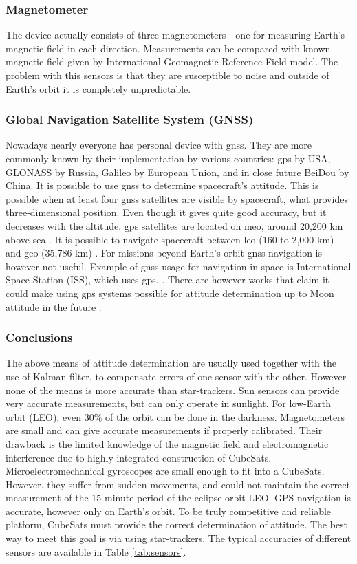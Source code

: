 \documentclass[12pt,a4paper,twoside]{article}
\begin{document}
\subsubsection{Magnetometer}
The device actually consists of three magnetometers - one for measuring Earth's magnetic field in each direction. Measurements can be compared with known magnetic field given by International Geomagnetic Reference Field model. The problem with this sensors is that they are susceptible to noise and outside of Earth's orbit it is completely unpredictable.
\subsubsection{Global Navigation Satellite System (GNSS)}
Nowadays nearly everyone has personal device with \gls{gnss}. They are more commonly known by their implementation by various countries: \gls{gps} by USA, GLONASS by Russia, Galileo by European Union, and in close future BeiDou by China. It is possible to use \gls{gnss} to determine spacecraft's attitude. This is possible when at least four \gls{gnss} satellites are visible by spacecraft, what provides three-dimensional position. Even though it gives quite good accuracy, but it decreases with the altitude. \gls{gps} satellites are located on \gls{meo}, around 20,200 km above sea \cite{gps-gov}. It is possible to navigate spacecraft between \gls{leo} (160 to 2,000 km) and \gls{geo} (35,786 km) \cite{nasa-gps-navigation}. For missions beyond Earth's orbit \gls{gnss} navigation is however not useful. Example of \gls{gnss} usage for navigation in space is International Space Station (ISS), which uses \gls{gps}. \cite{iss-gps}. There are however works that claim it could make using \gls{gps} systems possible for attitude determination up to Moon attitude in the future \cite{capuano2014gnss}.

\subsubsection{Conclusions}
The above means of attitude determination are usually used together with the use of Kalman filter, to compensate errors of one sensor with the other. However none of the means is more accurate than star-trackers.
Sun sensors can provide very accurate measurements, but can only operate in sunlight. For low-Earth orbit (LEO), even 30\% of the orbit can be done in the darkness. Magnetometers are small and can give accurate measurements if properly calibrated. Their drawback is the limited knowledge of the magnetic field and electromagnetic interference due to highly integrated construction of CubeSats.
Microelectromechanical gyroscopes are small enough to fit into a CubeSats. However, they suffer from sudden movements, and could not maintain the correct measurement of the 15-minute period of the eclipse orbit LEO. GPS navigation is accurate, however only on Earth's orbit. To be truly competitive and reliable platform, CubeSats must provide the correct determination of attitude. The best way to meet this goal is via using star-trackers. The typical accuracies of different sensors are available in Table \ref{tab:sensors}.
\end{document}
